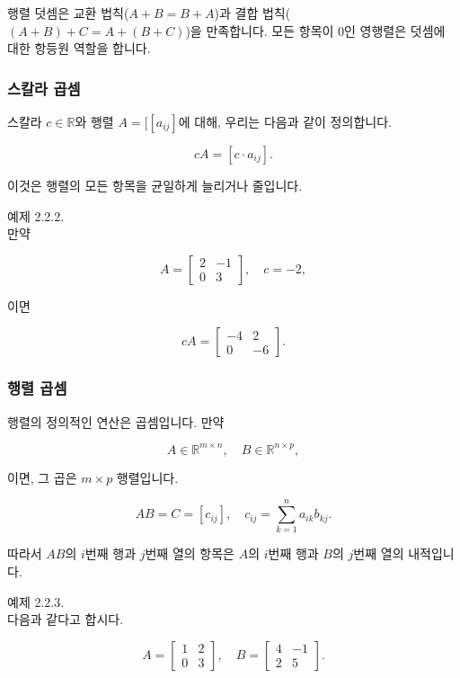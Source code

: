 \documentclass[
  12pt,
  a4paper,
]{article}
\begin{document}
행렬 덧셈은 교환 법칙(\(A+B = B+A\))과 결합 법칙(\((A+B)+C = A+(B+C)\))을 만족합니다. 모든 항목이 0인 영행렬은 덧셈에 대한 항등원 역할을 합니다.

\subsubsection{스칼라 곱셈}\label{scalar-multiplication-2}

스칼라 \(c \in \mathbb{R}\)와 행렬 \(A = [[a_{ij}]\)에 대해, 우리는 다음과 같이 정의합니다.

\[cA = [c \cdot a_{ij}].\]

이것은 행렬의 모든 항목을 균일하게 늘리거나 줄입니다.

예제 2.2.2.\\
만약

\[A = \begin{bmatrix}
2 & -1 \\
0 & 3
\end{bmatrix}, \quad c = -2,\]

이면

\[cA = \begin{bmatrix}
-4 & 2 \\
0 & -6
\end{bmatrix}.\]

\subsubsection{행렬 곱셈}\label{matrix-multiplication}

행렬의 정의적인 연산은 곱셈입니다. 만약

\[A \in \mathbb{R}^{m \times n}, \quad B \in \mathbb{R}^{n \times p},\]

이면, 그 곱은 \(m \times p\) 행렬입니다.

\[AB = C = [c_{ij}], \quad c_{ij} = \sum_{k=1}^n a_{ik} b_{kj}.\]

따라서 \(AB\)의 \(i\)번째 행과 \(j\)번째 열의 항목은 \(A\)의 \(i\)번째 행과 \(B\)의 \(j\)번째 열의 내적입니다.

예제 2.2.3.\\
다음과 같다고 합시다.

\[A = \begin{bmatrix}
1 & 2 \\
0 & 3
\end{bmatrix}, \quad
B = \begin{bmatrix}
4 & -1 \\
2 & 5
\end{bmatrix}.\]
\end{document}
